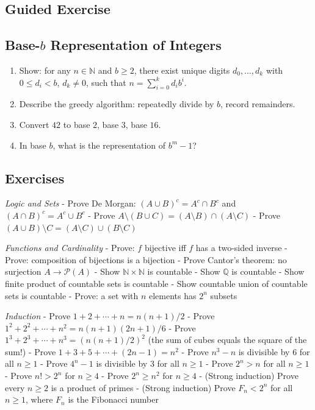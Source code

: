 \documentclass[
  10pt,
  letterpaper,
]{scrbook}
\newcommand{\NN}{\mathbb{N}}
\newcommand{\QQ}{\mathbb{Q}}
\begin{document}
\subsection{Guided Exercise}\label{guided-exercise}

\subsection{\texorpdfstring{Base-\(b\) Representation of
Integers}{Base-b Representation of Integers}}\label{base-b-representation-of-integers}

\begin{enumerate}
\def\labelenumi{(\alph{enumi})}
\item
  Show: for any \(n \in \NN\) and \(b \geq 2\), there exist unique
  digits \(d_0, \ldots, d_k\) with \(0 \leq d_i < b\), \(d_k \neq 0\),
  such that \(n = \sum_{i=0}^{k} d_i b^i\).
\item
  Describe the greedy algorithm: repeatedly divide by \(b\), record
  remainders.
\item
  Convert \(42\) to base \(2\), base \(3\), base \(16\).
\item
  In base \(b\), what is the representation of \(b^m - 1\)?
\end{enumerate}

\subsection{Exercises}\label{exercises}

\emph{Logic and Sets} - Prove De Morgan: \((A \cup B)^c = A^c \cap B^c\)
and \((A \cap B)^c = A^c \cup B^c\) - Prove
\(A \setminus (B \cup C) = (A \setminus B) \cap (A \setminus C)\) -
Prove \((A \cup B) \setminus C = (A \setminus C) \cup (B \setminus C)\)

\emph{Functions and Cardinality} - Prove: \(f\) bijective iff \(f\) has
a two-sided inverse - Prove: composition of bijections is a bijection -
Prove Cantor's theorem: no surjection \(A \to \mathcal{P}(A)\) - Show
\(\NN \times \NN\) is countable - Show \(\QQ\) is countable - Show
finite product of countable sets is countable - Show countable union of
countable sets is countable - Prove: a set with \(n\) elements has
\(2^n\) subsets

\emph{Induction} - Prove \(1 + 2 + \cdots + n = n(n+1)/2\) - Prove
\(1^2 + 2^2 + \cdots + n^2 = n(n+1)(2n+1)/6\) - Prove
\(1^3 + 2^3 + \cdots + n^3 = (n(n+1)/2)^2\) (the sum of cubes equals the
square of the sum!) - Prove \(1 + 3 + 5 + \cdots + (2n-1) = n^2\) -
Prove \(n^3 - n\) is divisible by 6 for all \(n \geq 1\) - Prove
\(4^n - 1\) is divisible by 3 for all \(n \geq 1\) - Prove \(2^n > n\)
for all \(n \geq 1\) - Prove \(n! > 2^n\) for \(n \geq 4\) - Prove
\(2^n \geq n^2\) for \(n \geq 4\) - (Strong induction) Prove every
\(n \geq 2\) is a product of primes - (Strong induction) Prove
\(F_n < 2^n\) for all \(n \geq 1\), where \(F_n\) is the Fibonacci
number
\end{document}
